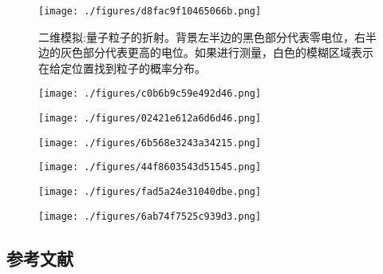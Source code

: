 \begin{figure}[ht]
\centering
\texttt{[image: ./figures/d8fac9f10465066b.png]}
\caption{二维模拟:量子粒子的折射。背景左半边的黑色部分代表零电位，右半边的灰色部分代表更高的电位。如果进行测量，白色的模糊区域表示在给定位置找到粒子的概率分布。} \label{fig_ZS_10}
\end{figure}

\item \begin{figure}[ht]
\centering
\texttt{[image: ./figures/c0b6b9c59e492d46.png]}
\caption\label{fig_ZS_11}
\end{figure}

\item \begin{figure}[ht]
\centering
\texttt{[image: ./figures/02421e612a6d6d46.png]}
\caption\label{fig_ZS_12}
\end{figure}

\item \begin{figure}[ht]
\centering
\texttt{[image: ./figures/6b568e3243a34215.png]}
\caption \label{fig_ZS_13}
\end{figure}

\item \begin{figure}[ht]
\centering
\texttt{[image: ./figures/44f8603543d51545.png]}
\caption\label{fig_ZS_14}
\end{figure}

\item \begin{figure}[ht]
\centering
\texttt{[image: ./figures/fad5a24e31040dbe.png]}
\caption \label{fig_ZS_15}
\end{figure}

\item \begin{figure}[ht]
\centering
\texttt{[image: ./figures/6ab74f7525c939d3.png]}
\caption \label{fig_ZS_16}
\end{figure}

\subsection{参考文献}

